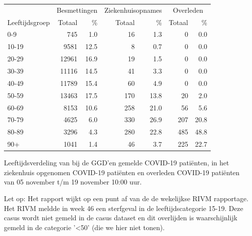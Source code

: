\documentclass[
  english,
  man,floatsintext]{apa6}
\begin{document}
\begin{table}[H]
\centering\begingroup\fontsize{11}{13}\selectfont

\begin{threeparttable}
\begin{tabular}{lrrrrrr}
\toprule
\multicolumn{1}{c}{ } & \multicolumn{2}{c}{Besmettingen} & \multicolumn{2}{c}{Ziekenhuisopnames} & \multicolumn{2}{c}{Overleden} \\
\cmidrule(l{3pt}r{3pt}){2-3} \cmidrule(l{3pt}r{3pt}){4-5} \cmidrule(l{3pt}r{3pt}){6-7}
Leeftijdsgroep & Totaal & \% & Totaal & \% & Totaal & \%\\
\midrule
0-9 & 745 & 1.0 & 16 & 1.3 & 0 & 0.0\\
10-19 & 9581 & 12.5 & 8 & 0.7 & 0 & 0.0\\
20-29 & 12961 & 16.9 & 19 & 1.5 & 0 & 0.0\\
30-39 & 11116 & 14.5 & 41 & 3.3 & 0 & 0.0\\
40-49 & 11789 & 15.4 & 60 & 4.9 & 0 & 0.0\\
50-59 & 13463 & 17.5 & 170 & 13.8 & 20 & 2.0\\
60-69 & 8153 & 10.6 & 258 & 21.0 & 56 & 5.6\\
70-79 & 4625 & 6.0 & 330 & 26.9 & 207 & 20.8\\
80-89 & 3296 & 4.3 & 280 & 22.8 & 485 & 48.8\\
90+ & 1041 & 1.4 & 46 & 3.7 & 225 & 22.7\\
\bottomrule
\end{tabular}
\begin{tablenotes}
\item[1] Leeftijdsverdeling van bij de GGD’en gemelde COVID-19 patiënten, in het ziekenhuis opgenomen COVID-19 patiënten en overleden COVID-19 patiënten van 05 november t/m 19 november 10:00 uur.
\item[2] Let op: Het rapport wijkt op een punt af van de de wekelijkse RIVM rapportage. Het RIVM meldde in week 46 een sterfgeval in de leeftijdscategorie 15-19. Deze casus wordt niet gemeld in de casus dataset en dit overlijden is waarschijnlijk gemeld in de categorie '<50' (die we hier niet tonen).
\end{tablenotes}
\end{threeparttable}
\endgroup{}
\end{table}

\newpage
\end{document}
